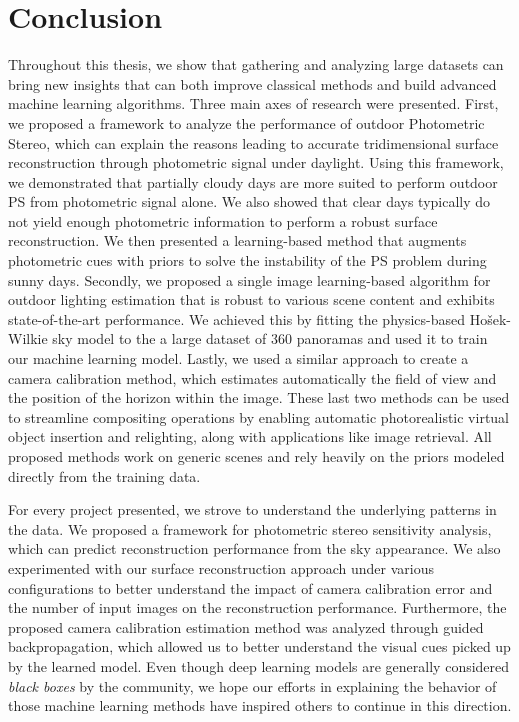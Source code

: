 \chapter*{Conclusion}         %


Throughout this thesis, we show that gathering and analyzing large datasets can bring new insights that can both improve classical methods and build advanced machine learning algorithms. Three main axes of research were presented. First, we proposed a framework to analyze the performance of outdoor Photometric Stereo, which can explain the reasons leading to accurate tridimensional surface reconstruction through photometric signal under daylight. Using this framework, we demonstrated that partially cloudy days are more suited to perform outdoor PS from photometric signal alone. We also showed that clear days typically do not yield enough photometric information to perform a robust surface reconstruction. We then presented a learning-based method that augments photometric cues with priors to solve the instability of the PS problem during sunny days. Secondly, we proposed a single image learning-based algorithm for outdoor lighting estimation that is robust to various scene content and exhibits state-of-the-art performance. We achieved this by fitting the physics-based Ho\v{s}ek-Wilkie sky model to the a large dataset of 360 panoramas and used it to train our machine learning model. Lastly, we used a similar approach to create a camera calibration method, which estimates automatically the field of view and the position of the horizon within the image. These last two methods can be used to streamline compositing operations by enabling automatic photorealistic virtual object insertion and relighting, along with applications like image retrieval. All proposed methods work on generic scenes and rely heavily on the priors modeled directly from the training data. 

For every project presented, we strove to understand the underlying patterns in the data. We proposed a framework for photometric stereo sensitivity analysis, which can predict reconstruction performance from the sky appearance. We also experimented with our surface reconstruction approach under various configurations to better understand the impact of camera calibration error and the number of input images on the reconstruction performance. Furthermore, the proposed camera calibration estimation method was analyzed through guided backpropagation, which allowed us to better understand the visual cues picked up by the learned model. Even though deep learning models are generally considered \emph{black boxes} by the community, we hope our efforts in explaining the behavior of those machine learning methods have inspired others to continue in this direction.

